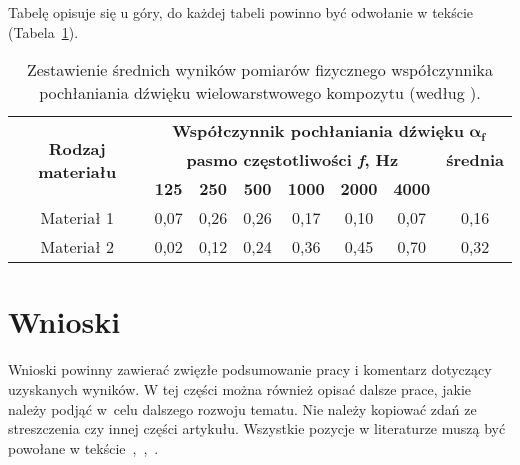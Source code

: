 \documentclass[12pt]{oska}
\begin{document}
Tabelę opisuje się u góry, do każdej tabeli powinno być odwołanie w tekście (Tabela~\ref{tab1}).

\begin{table}[H]
	\centering
	\caption{Zestawienie średnich wyników pomiarów fizycznego współczynnika pochłaniania dźwięku wielowarstwowego kompozytu (według \cite{bib2}).}
	\label{tab1}
	\begin{tabular}{|c|c|c|c|c|c|c|c|}
		\hline
		\multirow{3}{*}{\textbf{Rodzaj materiału}} & \multicolumn{7}{|c|}{\textbf{Współczynnik pochłaniania dźwięku} $\boldsymbol{\alpha_f}$} \\\cline{2-8}
		& \multicolumn{6}{|c|}{\textbf{pasmo częstotliwości \textit{f},
	    \si{\hertz}}} & \textbf{średnia}\\\cline{2-8}
		& \textbf{125} & \textbf{250} & \textbf{500} & \textbf{1000} & \textbf{2000} & \textbf{4000} &\\\hline
		Materiał 1 & 0,07 & 0,26 & 0,26 & 0,17 & 0,10 & 0,07 & 0,16 \\\hline
		Materiał 2 & 0,02 & 0,12 & 0,24 & 0,36 & 0,45 & 0,70 & 0,32 \\\hline
	\end{tabular}
\end{table}

\section{Wnioski}

Wnioski powinny zawierać zwięzłe podsumowanie pracy i komentarz dotyczący uzyskanych wyników. W tej części można również opisać dalsze prace, jakie należy podjąć w celu dalszego rozwoju tematu. Nie należy kopiować zdań ze streszczenia czy innej części artykułu. Wszystkie pozycje w literaturze muszą być powołane w tekście~\cite{bib3},~\cite{bib4},~\cite{bib5}. 

\printbibliography
\end{document}
